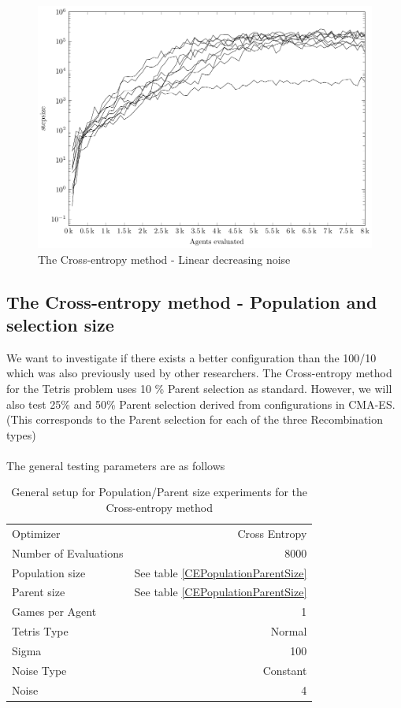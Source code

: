 \begin{figure}[H]
\begin{center}
\includegraphics[scale=0.48]{plots/linearNoisePlot}
\end{center}
\caption{The Cross-entropy method - Linear decreasing noise}
\end{figure}


\clearpage

\subsection{The Cross-entropy method - Population and selection size \label{appendixCrossEntropyConfig}}
We want to investigate if there exists a better configuration than the 100/10 which was also previously used by other researchers.
The Cross-entropy method for the Tetris problem uses 10 \% Parent selection as standard. However, we will also test 25\% and 50\% Parent selection derived from configurations in CMA-ES. (This corresponds to the Parent selection for each of the three Recombination types)\\
\\
The general testing parameters are as follows
\begin{table}[h]
\centering
\begin{tabular}{l r}
Optimizer & Cross Entropy\\
Number of Evaluations & 8000\\
Population size & See table \ref{CEPopulationParentSize}\\
Parent size & See table \ref{CEPopulationParentSize}\\
Games per Agent & 1\\
Tetris Type & Normal\\
\hline
Sigma & 100\\
Noise Type & Constant\\
Noise & 4
\end{tabular}
\caption{General setup for Population/Parent size experiments for the Cross-entropy method}
\end{table}

